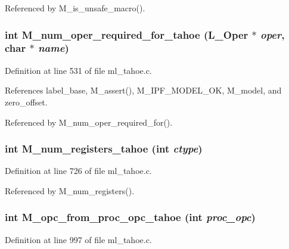 Referenced by M\_\-is\_\-unsafe\_\-macro().
\subsubsection{\setlength{\rightskip}{0pt plus 5cm}int M\_\-num\_\-oper\_\-required\_\-for\_\-tahoe (L\_\-Oper $\ast$ {\em oper}, char $\ast$ {\em name})}\label{m__tahoe_8h_9835bdfa6c2e962e59744b93344ee773}




Definition at line 531 of file ml\_\-tahoe.c.

References label\_\-base, M\_\-assert(), M\_\-IPF\_\-MODEL\_\-OK, M\_\-model, and zero\_\-offset.

Referenced by M\_\-num\_\-oper\_\-required\_\-for().
\subsubsection{\setlength{\rightskip}{0pt plus 5cm}int M\_\-num\_\-registers\_\-tahoe (int {\em ctype})}\label{m__tahoe_8h_4992cb0d712ac7229fddeb7990d4b6b7}




Definition at line 726 of file ml\_\-tahoe.c.

Referenced by M\_\-num\_\-registers().
\subsubsection{\setlength{\rightskip}{0pt plus 5cm}int M\_\-opc\_\-from\_\-proc\_\-opc\_\-tahoe (int {\em proc\_\-opc})}\label{m__tahoe_8h_cdd8462d16e66d8641908c597a1729e6}




Definition at line 997 of file ml\_\-tahoe.c.

